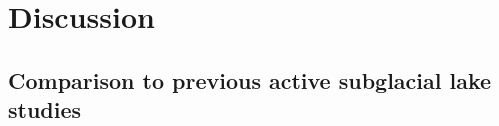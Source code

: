 %

%
%
%
%
%
%
%


\clearpage
\section{Discussion}

\subsection{Comparison to previous active subglacial lake studies} \label{sec:compare_previous_lakes}

